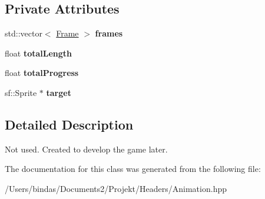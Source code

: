 \subsection*{Private Attributes}
\begin{DoxyCompactItemize}
\item 
\mbox{\label{class_animation_a6b5206eee8cc91ba5d2fad8dc0918fa6}} 
std\+::vector$<$ \mbox{\hyperlink{struct_frame}{Frame}} $>$ {\bfseries frames}
\item 
\mbox{\label{class_animation_ad1d26de93871e0cd4416cd2ed6a5b661}} 
float {\bfseries total\+Length}
\item 
\mbox{\label{class_animation_a4213400672f91d1a95d142284553bdeb}} 
float {\bfseries total\+Progress}
\item 
\mbox{\label{class_animation_a353b7dfba660075b0e94085dc6e21c9c}} 
sf\+::\+Sprite $\ast$ {\bfseries target}
\end{DoxyCompactItemize}


\subsection{Detailed Description}
Not used. Created to develop the game later. 

The documentation for this class was generated from the following file\+:\begin{DoxyCompactItemize}
\item 
/\+Users/bindas/\+Documents2/\+Projekt/\+Headers/Animation.\+hpp\end{DoxyCompactItemize}
